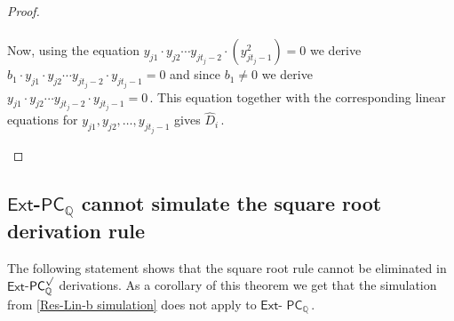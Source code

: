 \documentclass[11pt]{article}
\newcommand{\Q}{{\mathbb Q}}
\begin{document}
\begin{proof}
\begin{itemize}
\begin{multline*}
    \end{multline*}
    Now, using the equation  $y_{j 1} \cdot y_{j 2} \cdots y_{j t_j - 2} \cdot (y_{j t_j - 1}^2) = 0$ we derive $ b_1 \cdot y_{j 1} \cdot y_{j 2} \cdots y_{j t_j - 2} \cdot y_{j t_j - 1} = 0$ and since $b_1 \neq 0$ we derive %
$y_{j 1} \cdot y_{j 2} \cdots y_{j t_j - 2} \cdot y_{j t_j - 1} = 0\,.$ %
 This equation together with the corresponding linear equations for  $y_{j 1}, y_{j 2}, \ldots, y_{j t_j - 1}$ gives %
$\widehat{D}_i\,.$ %
   \qedhere %
\end{itemize}
\end{proof}     %


\subsection{\texorpdfstring{$\mathsf{Ext}$-$\mathsf{PC}_{\Q}$}{Ext-PC-Q}
 cannot simulate the square root derivation rule}

%
The following statement shows that the square root rule cannot be eliminated in $\mathsf{Ext}$-$\mathsf{PC}_{\Q}^\surd$ derivations. As a corollary of this theorem we get that the simulation from \autoref{Res-Lin-b simulation} does not apply to $\mathsf{Ext}$-%
$\mathsf{PC}_{\Q}\,.$ %
%
\end{document}
